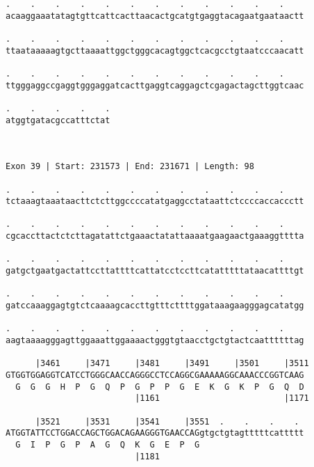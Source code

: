 \documentclass{article}
\begin{document}
\begin{Verbatim}
.    .    .    .    .    .    .    .    .    .    .    .    
acaaggaaatatagtgttcattcacttaacactgcatgtgaggtacagaatgaataactt
                                                            
.    .    .    .    .    .    .    .    .    .    .    .    
ttaataaaaagtgcttaaaattggctgggcacagtggctcacgcctgtaatcccaacatt
                                                            
.    .    .    .    .    .    .    .    .    .    .    .    
ttgggaggccgaggtgggaggatcacttgaggtcaggagctcgagactagcttggtcaac
                                                            
.    .    .    .    .
atggtgatacgccatttctat
                     
                     
 
Exon 39 | Start: 231573 | End: 231671 | Length: 98
 
.    .    .    .    .    .    .    .    .    .    .    .    
tctaaagtaaataacttctcttggccccatatgaggcctataattctccccaccaccctt
                                                            
.    .    .    .    .    .    .    .    .    .    .    .    
cgcaccttactctcttagatattctgaaactatattaaaatgaagaactgaaaggtttta
                                                            
.    .    .    .    .    .    .    .    .    .    .    .    
gatgctgaatgactattccttattttcattatcctccttcatatttttataacattttgt
                                                            
.    .    .    .    .    .    .    .    .    .    .    .    
gatccaaaggagtgtctcaaaagcaccttgtttcttttggataaagaagggagcatatgg
                                                            
.    .    .    .    .    .    .    .    .    .    .    .    
aagtaaaagggagttggaaattggaaaactgggtgtaacctgctgtactcaattttttag
                                                            
      |3461     |3471     |3481     |3491     |3501     |3511
GTGGTGGAGGTCATCCTGGGCAACCAGGGCCTCCAGGCGAAAAAGGCAAACCCGGTCAAG
  G  G  G  H  P  G  Q  P  G  P  P  G  E  K  G  K  P  G  Q  D
                          |1161                         |1171
  
      |3521     |3531     |3541     |3551  .    .    .    . 
ATGGTATTCCTGGACCAGCTGGACAGAAGGGTGAACCAGgtgctgtagtttttcattttt
  G  I  P  G  P  A  G  Q  K  G  E  P  G                     
                          |1181                             
  

\end{Verbatim}
\end{document}
